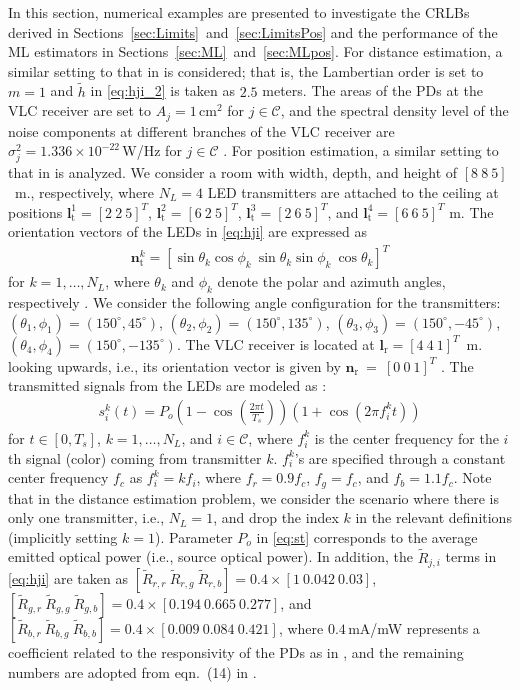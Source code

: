 \documentclass[10pt,twocolumn]{IEEEtran}
\newcommand{\mtC}{{\mathcal{C}}}
\newcommand{\lr}{{\boldsymbol{l}_{\mathrm{r}}}}
\newcommand{\lt}[1]{{\boldsymbol{l}^{#1}_{\mathrm{t}}}}
\newcommand{\nr}{{\boldsymbol{n}_{\mathrm{r}}}}
\newcommand{\nt}[1]{{\boldsymbol{n}^{#1}_{\mathrm{t}}}}
\begin{document}
In this section, numerical examples are presented to investigate the CRLBs derived in Sections~\ref{sec:Limits}~and~\ref{sec:LimitsPos} and the performance of the ML estimators in Sections~\ref{sec:ML}~and~\ref{sec:MLpos}. For distance estimation, a similar setting to that in \cite{MFK_CRLB} is considered; that is, the Lambertian order is set to $m=1$ and $\tilde{h}$ in \eqref{eq:hji_2} is taken as $2.5$ meters. The areas of the PDs at the VLC receiver are set to $A_j=1\,$cm$^2$ for $j\in\mtC$, and the spectral density level of the noise components at different branches of the VLC receiver are $\sigma_j^2=1.336\times10^{-22}\,$W/Hz for $j\in\mtC$ \cite{MFK_CRLB,CRB_TOA_VLC}. For position estimation, a similar setting to that in \cite{Direct_TCOM} is analyzed. We consider a room with width, depth, and height of $[8~8~5]$~m., respectively, where $N_L=4$ LED transmitters are attached to the ceiling at positions $\lt{1}=[2~2~5]^T$, $\lt{2}=[6~2~5]^T$, $\lt{3}=[2~6~5]^T$, and $\lt{4}=[6~6~5]^T$ m. The orientation vectors of the LEDs in \eqref{eq:hji} are expressed as
\begin{gather}\label{eq:orient_res}
\nt{k} = [\sin\theta_k \cos\phi_k~\sin\theta_k \sin\phi_k~\cos\theta_k]^T
\end{gather}
for $k = 1,\dots,N_L$, where $\theta_k$ and $\phi_k$ denote the polar and azimuth angles, respectively \cite{Lampe_MISO_TSP_2016}. We consider the following angle configuration for the transmitters: $(\theta_1, \phi_1)=(150^{\circ},45^{\circ})$, $(\theta_2, \phi_2)=(150^{\circ},135^{\circ})$, $(\theta_3, \phi_3)=(150^{\circ},-45^{\circ})$, $(\theta_4, \phi_4)=(150^{\circ},-135^{\circ})$. The VLC receiver is located at $\lr=[4~4~1]^T$~m. looking upwards, i.e., its orientation vector is given by $\nr~=~[0~0~1]^T$  \cite{Direct_TCOM}. The transmitted signals from the LEDs are modeled as \cite{CRB_TOA_VLC}:
\begin{gather}\label{eq:st}
s_i^k(t)=P_o\left(1-\cos\left(\frac{2\pi t}{T_s}\right)\right)\left(1+\cos(2\pi f_i^k t)\right)
\end{gather}
for $t\in[0,T_s]$, $k=1,\dots,N_L$, and $i\in\mtC$, where $f_i^k$ is the center frequency for the $i$th signal (color) coming from transmitter $k$. $f_i^k$'s are specified through a constant center frequency $f_c$ as $f_i^k = k f_i$, where $f_r=0.9f_c$, $f_g=f_c$, and $f_b=1.1f_c$. Note that in the distance estimation problem, we consider the scenario where there is only one transmitter, i.e., $N_L=1$, and drop the index $k$ in the relevant definitions (implicitly setting $k=1$). Parameter $P_o$ in \eqref{eq:st} corresponds to the average emitted optical power (i.e., source optical power). In addition, the $\tilde{R}_{j,i}$ terms in \eqref{eq:hji} are taken as $[\tilde{R}_{r,r}~\tilde{R}_{r,g}~\tilde{R}_{r,b}]=0.4\times[1~0.042~0.03]$, $[\tilde{R}_{g,r}~\tilde{R}_{g,g}~\tilde{R}_{g,b}]=0.4\times[0.194~0.665~0.277]$, and $[\tilde{R}_{b,r}~\tilde{R}_{b,g}~\tilde{R}_{b,b}]=0.4\times[0.009~0.084~0.421]$, where $0.4\,$mA/mW represents a coefficient related to the responsivity of the PDs as in \cite{MFK_CRLB}, and the remaining numbers are adopted from eqn.~(14) in \cite{ColorShiftKeying_JLT14}.
\end{document}
